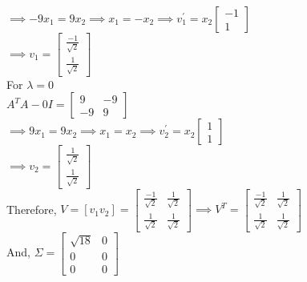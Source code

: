\documentclass[12pt]{article}
\begin{document}
\begin{enumerate}[label=(\alph*)]
$\implies -9x_1 = 9x_2 \implies x_1 = -x_2 \implies v_1^{'} = x_2 \begin{bmatrix}
-1 \\ 1
\end{bmatrix}$ \\
$\implies v_1 = \begin{bmatrix}
\frac{-1}{\sqrt{2}} \\ \frac{1}{\sqrt{2}}
\end{bmatrix} $ \\

For $\lambda = 0$ \\
$A^TA - 0I = \begin{bmatrix}
    9 & -9 \\ 
    -9 & 9
\end{bmatrix} $\\

$\implies 9x_1 = 9x_2 \implies x_1 = x_2 \implies v_2^{'} = x_2 \begin{bmatrix}
1 \\ 1
\end{bmatrix}$ \\

$\implies v_2 = \begin{bmatrix}
\frac{1}{\sqrt{2}} \\ \frac{1}{\sqrt{2}} \end{bmatrix} $ \\

Therefore,
$ V = [v_1 v_2] = \begin{bmatrix}
    \frac{-1}{\sqrt{2}} & \frac{1}{\sqrt{2}} \\ 
    \frac{1}{\sqrt{2}} & \frac{1}{\sqrt{2}} 
\end{bmatrix} \implies V^T = \begin{bmatrix}
    \frac{-1}{\sqrt{2}} & \frac{1}{\sqrt{2}} \\ 
    \frac{1}{\sqrt{2}} & \frac{1}{\sqrt{2}} 
\end{bmatrix} $ \\

And, $\Sigma = \begin{bmatrix}
    \sqrt{18} & 0 \\ 0 & 0 \\ 0 & 0
\end{bmatrix}$ \\


\end{enumerate}
\end{document}
